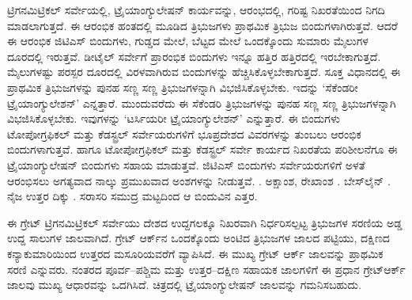 ಟ್ರಿಗನಮಿಟ್ರಿಕಲ್​ ಸರ್ವೇಯಲ್ಲಿ, ಟ್ರೈಯಾಂಗ್ಯುಲೇಷನ್​ ಕಾರ್ಯವನ್ನು, ಆರಂಭದಲ್ಲಿ, ಗರಿಷ್ಟ ನಿಖರತೆಯಿಂದ ನಿಗದಿ ಮಾಡಲಾಗುತ್ತದೆ. ಈ ಆರಂಭಿಕ ಹಂತದಲ್ಲಿ ಮೂಡಿದ ತ್ರಿಭುಜಗಳು ಪ್ರಾಥಮಿಕ ತ್ರಿಭುಜ ಬಿಂದುಗಳಾಗಿರುತ್ತವೆ. ಆದರೆ ಈ ಆರಂಭಿಕ ಜಿಟಿಎಸ್​ ಬಿಂದುಗಳು, ಗುಡ್ಡದ ಮೇಲೆ, ಬೆಟ್ಟದ ಮೇಲೆ ಒಂದಕ್ಕೊಂದು ಸುಮಾರು  ಮೈಲುಗಳ ದೂರದಲ್ಲಿ ಇರುತ್ತವೆ. ಡೀಟೈಲ್​ ಸರ್ವೇಗೆ ಪ್ರಾರಂಭಿಕ ಬಿಂದುಗಳು ಇನ್ನೂ ಹತ್ತಿರ ಹತ್ತಿರದಲ್ಲಿ ಇರಬೇಕಾಗುತ್ತದೆ.  ಮೈಲುಗಳಷ್ಟು ಪರಸ್ಪರ ದೂರದಲ್ಲಿ ವಿರಳವಾಗಿರುವ ಬಿಂದುಗಳನ್ನು ಹೆಚ್ಚಿಸಿಕೊಳ್ಳಬೇಕಾಗುತ್ತದೆ. ಸೂಕ್ತ ವಿಧಾನದಲ್ಲಿ ಈ ಪ್ರಾಥಮಿಕ ತ್ರಿಭುಜಗಳನ್ನು ಪುನಹ ಸಣ್ಣ ಸಣ್ಣ ತ್ರಿಭುಜಗಳನ್ನಾಗಿ ವಿಭಜಿಸಿಕೊಳ್ಳಬೇಕು. ಇದನ್ನು ‘ಸೆಕೆಂಡರೀ ಟ್ರೈಯಾಂಗ್ಯುಲೇಶನ್​’ ಎನ್ನತ್ತಾರೆ. ಮುಂದುವರೆದು ಈ ಸೆಕೆಂಡರಿ ತ್ರಿಭುಜಗಳನ್ನು ಪುನಹ ಸಣ್ಣ ಸಣ್ಣ ತ್ರಿಭುಜಗಳನ್ನಾಗಿ ವಿಭಜಿಸಿಕೊಳ್ಳಬೇಕು. ಇವುಗಳನ್ನು ‘ಟರ್ಸಿಯರೀ ಟ್ರೈಯಾಂಗ್ಯುಲೇಶನ್​’ ಎನ್ನುತ್ತಾರೆ. ಈ ಬಿಂದುಗಳು ಟೋಪೋಗ್ರಫಿಕಲ್​ ಮತ್ತು ಕೆಡಸ್ಟ್ರಲ್​ ಸರ್ವೇಯರುಗಳಿಗೆ ಭೂಪ್ರದೇಶದ ವಿವರಗಳನ್ನು ತುಂಬಲು ಆರಂಭಿಕ ಬಿಂದುಗಳಾಗುತ್ತವೆ. ಹಾಗೂ ಟೋಪೋಗ್ರಫಿಕಲ್​ ಮತ್ತು ಕೆಡಸ್ಟ್ರಲ್​ ಸರ್ವೇ ಕಾರ್ಯದ ನಿಖರತೆಯ ಪರಿಶೀಲನೆಗೂ ಈ ಟ್ರೈಯಾಂಗ್ಯುಲೇಷನ್​ ಬಿಂದುಗಳು ಸಹಾಯ ಮಾಡುತ್ತವೆ. ಜಿಟಿಎಸ್​ ಬಿಂದುಗಳು ಸರ್ವೇಯರುಗಳಿಗೆ ಅಳತೆ ಆರಂಭಿಸಲು ಅಗತ್ಯವಾದ ನಾಲ್ಕು ಪ್ರಮುಖವಾದ ಅಂಶಗಳನ್ನು ನೀಡುತ್ತವೆ. . ಅಕ್ಷಾಂಶ, ರೇಖಾಂಶ . ಬೇಸ್​ ಲೈನ್​ . ನೈಜ ಉತ್ತರ ದಿಕ್ಕು . ಸರಾಸರಿ ಸಮುದ್ರ ಮಟ್ಟದಿಂದ ಆ ಬಿಂದುವಿನ ಎತ್ತರ.

ಈ ಗ್ರೇಟ್​ ಟ್ರಿಗನಮಿಟ್ರಿಕಲ್​ ಸರ್ವೇಯು ದೇಶದ ಉದ್ದಗಲಕ್ಕೂ ನಿಖರವಾಗಿ ನಿರ್ಧರಿಸಲ್ಪಟ್ಟ ತ್ರಿಭುಜಗಳ ಸರಣಿಯ ಅಡ್ಡ ಉದ್ದ ಸಾಲುಗಳ ಜಾಲವಾಗಿದೆ. ಗ್ರೇಟ್​ ಆರ್ಕ್‌ನ ಒಂದಕ್ಕೊಂದು ಅಂಟಿದ ತ್ರಿಭುಜಗಳ ಜಾಲದ ಪಟ್ಟಿಯು, ದಕ್ಷಿಣದ ಕನ್ಯಾಕುಮಾರಿಯಿಂದ ಉತ್ತರದ ಮಸೂರಿಯವರೆಗೆ ವ್ಯಾಪಿಸಿದೆ. ಈ ಮುಖ್ಯ ಗ್ರೇಟ್​ ಆರ್ಕ್ ಜಾಲವನ್ನು ಪ್ರಾಥಮಿಕ ಸರಣಿ ಎನ್ನುವರು. ನಂತರದ ಪೂರ್ವ–ಪಶ್ಚಿಮ ಮತ್ತು ಉತ್ತರ–ದಕ್ಷಿಣ ಸಹಾಯಕ ಜಾಲಗಳಿಗೆ ಈ ಪ್ರಧಾನ ಗ್ರೇಟ್​ ಆರ್ಕ್ ಜಾಲವು ಮುಖ್ಯ ಆಧಾರವನ್ನು ಒದಗಿಸಿದೆ. ಚಿತ್ರದಲ್ಲಿ ಟ್ರೈಯಾಂಗ್ಯುಲೇಷನ್​ ಜಾಲವನ್ನು ಗಮನಿಸಬಹುದು.

